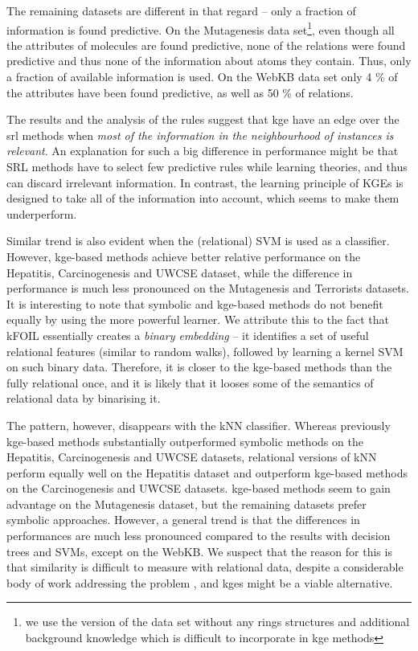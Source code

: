 The remaining datasets are different in that regard -- only a fraction of information is found predictive.
On the Mutagenesis data set\footnote{we use the version of the data set without any rings structures and additional background knowledge which is difficult to incorporate in \gls{kge} methods}, even though all the attributes of molecules are found predictive, none of the relations were found predictive and thus none of the information about atoms they contain.
Thus, only a fraction of available information is used.
On the WebKB data set only 4 \% of the attributes have been found predictive, as well as 50 \% of relations.



The results and the analysis of the rules suggest that \gls{kge} have an edge over the \gls{srl} methods when \textit{most of the information in the neighbourhood of instances is relevant}.
An explanation for such a big difference in performance might be that SRL methods have to select few predictive rules while learning theories, and thus can discard irrelevant information.
In contrast, the learning principle of KGEs is designed to take all of the information into account, which seems to make them underperform.




Similar trend is also evident when the (relational) SVM is used as a classifier.
However, \gls{kge}-based methods achieve better relative performance on the Hepatitis, Carcinogenesis and UWCSE dataset, while the difference in performance is much less pronounced on the Mutagenesis and Terrorists datasets.
It is interesting to note that symbolic and \gls{kge}-based methods do not benefit equally by using the more powerful learner.
We attribute this to the fact that kFOIL essentially creates a \textit{binary embedding} -- it identifies a set of useful relational features (similar to random walks), followed by learning a kernel SVM on such binary data.
Therefore,  it is closer to the \gls{kge}-based methods than the fully relational once, and it is likely that it looses some of the semantics of relational data by binarising it.



The pattern, however, disappears with the kNN classifier.
Whereas previously \gls{kge}-based methods substantially outperformed symbolic methods on the Hepatitis, Carcinogenesis and UWCSE datasets, relational versions of kNN perform equally well on the Hepatitis dataset and outperform \gls{kge}-based methods on the Carcinogenesis and UWCSE datasets.
\gls{kge}-based methods seem to gain advantage on the Mutagenesis dataset, but the remaining datasets prefer symbolic approaches.
However, a general trend is that the differences in performances are much less pronounced compared to the results with decision trees and SVMs, except on the WebKB.
We suspect that the reason for this is that similarity is difficult to measure with relational data, despite a considerable body of work addressing the problem \cite{Dumancic2017a}, and \gls{kge}s might be a viable alternative.



